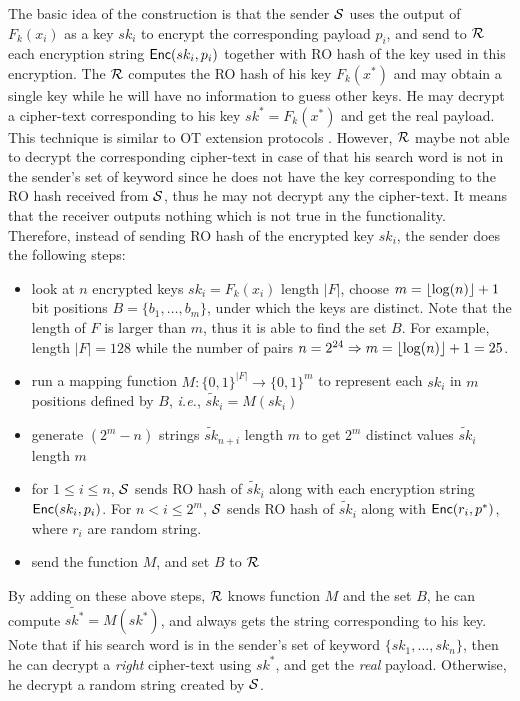 The basic idea of the \SSOT construction is that the sender $\mathcal{S}$ uses the output of $F_k(x_i)$ as a key $sk_i$ to encrypt the corresponding payload $p_i$, and send to $\mathcal{R}$ each encryption string $\mathsf{Enc}(sk_i,p_i)$ together with RO hash of the key used in this encryption.  The $\mathcal{R}$ computes the RO hash of his key $F_k(x^*)$ and may obtain a single key while he will have no information to guess other keys. He may decrypt a cipher-text corresponding to his key $sk^*=F_k(x^*)$ and get the real payload.   This technique is similar to OT extension protocols  \cite{C:IKNP03,C:KolKum13}. However, $\mathcal{R}$ maybe not able to decrypt the corresponding cipher-text in case of that his search word is not in the sender's set of keyword since he does not have the key corresponding to the RO hash received from $\mathcal{S}$, thus he may not decrypt any the cipher-text. It means that the receiver outputs nothing which is not true in the \SSOT functionality. Therefore, instead of sending RO hash of the encrypted key $sk_i$, the sender does the following steps:
\begin{itemize}
	\item look at $n$ encrypted keys $sk_i=F_k(x_i)$ length $|F|$, choose $m={\lfloor{\log(n)}\rfloor}+1$ bit positions $B=\{b_1,  \ldots, b_m\}$, under which the keys are distinct. Note that the length of $F$ is larger than $m$, thus it is able to find the set $B$. For example, length $|F|=128$ while the number of pairs $n=2^{24} \Rightarrow m={\lfloor{\log(n)}\rfloor}+1=25$.
	\item run a mapping function $M: \{0,1\}^{|F|} \rightarrow \{0,1\}^m$ to represent each $sk_i$ in $m$ positions defined by $B$, \textit{i.e.}, $\tilde{sk}_{i}=M(sk_i)$
	\item generate $(2^m-n)$ strings $\tilde{sk}_{n+i}$ length $m$ to get $2^m$ distinct values $\tilde{sk}_{i}$ length $m$
	\item for $1\leq i \leq n$, $\mathcal{S}$ sends RO hash of $\tilde{sk}_{i}$ along with each encryption string $\mathsf{Enc}(sk_i,p_i)$. For $n < i \leq 2^m$, $\mathcal{S}$ sends RO hash of $\tilde{sk}_{i}$ along with $\mathsf{Enc}(r_i,p^*)$, where $r_i$ are random string.
	\item send the function $M$, and set $B$	to $\mathcal{R}$
\end{itemize}


By adding on these above steps, $\mathcal{R}$ knows function $M$ and the set $B$, he can compute $\tilde{sk^*}=M(sk^*)$, and always gets the string corresponding to his key. Note that if his search word is in the sender's set of keyword $\{sk_1, \ldots , sk_n\}$, then he can decrypt a \textit{right} cipher-text using $sk^*$, and get the \textit{real} payload. Otherwise, he decrypt a random string created by $\mathcal{S}$.


